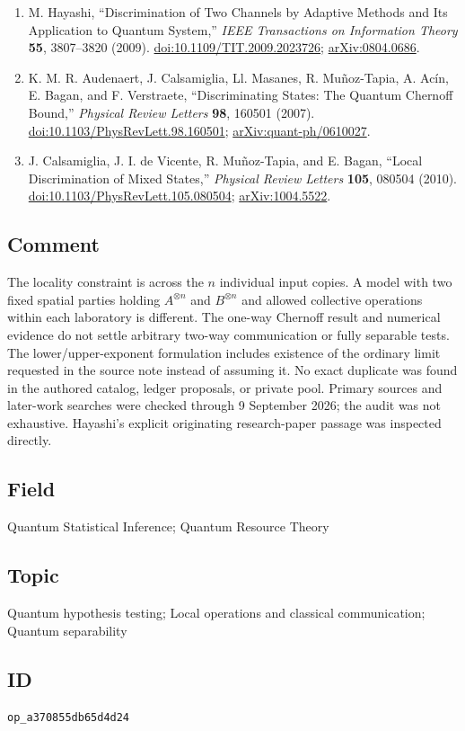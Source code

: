 \begin{enumerate}[label={},leftmargin=4.8em,labelsep=0.5em]
  \footnotesize
  \item[\textup{[Hay09]}]\label{ref:copych-hayashi}
  M. Hayashi, ``Discrimination of Two Channels by Adaptive Methods and Its Application to Quantum System,'' \emph{IEEE Transactions on Information Theory} \textbf{55}, 3807–3820 (2009). \href{https://doi.org/10.1109/TIT.2009.2023726}{doi:10.1109/TIT.2009.2023726}; \href{https://arxiv.org/abs/0804.0686}{arXiv:0804.0686}.

  \item[\textup{[ACM+07]}]\label{ref:copych-quantum}
  K. M. R. Audenaert, J. Calsamiglia, Ll. Masanes, R. Muñoz-Tapia, A. Acín, E. Bagan, and F. Verstraete, ``Discriminating States: The Quantum Chernoff Bound,'' \emph{Physical Review Letters} \textbf{98}, 160501 (2007). \href{https://doi.org/10.1103/PhysRevLett.98.160501}{doi:10.1103/PhysRevLett.98.160501}; \href{https://arxiv.org/abs/quant-ph/0610027}{arXiv:quant-ph/0610027}.

  \item[\textup{[CdVMB10]}]\label{ref:copych-numerics}
  J. Calsamiglia, J. I. de Vicente, R. Muñoz-Tapia, and E. Bagan, ``Local Discrimination of Mixed States,'' \emph{Physical Review Letters} \textbf{105}, 080504 (2010). \href{https://doi.org/10.1103/PhysRevLett.105.080504}{doi:10.1103/PhysRevLett.105.080504}; \href{https://arxiv.org/abs/1004.5522}{arXiv:1004.5522}.
\end{enumerate}

\subsection*{Comment}

The locality constraint is across the $n$ individual input copies. A model with two fixed spatial parties holding $A^{\otimes n}$ and $B^{\otimes n}$ and allowed collective operations within each laboratory is different. The one-way Chernoff result and numerical evidence do not settle arbitrary two-way communication or fully separable tests. The lower/upper-exponent formulation includes existence of the ordinary limit requested in the source note instead of assuming it. No exact duplicate was found in the authored catalog, ledger proposals, or private pool. Primary sources and later-work searches were checked through 9 September 2026; the audit was not exhaustive. Hayashi's explicit originating research-paper passage was inspected directly.

\subsection*{Field}

Quantum Statistical Inference; Quantum Resource Theory

\subsection*{Topic}

Quantum hypothesis testing; Local operations and classical communication; Quantum separability

\subsection*{ID}

\texttt{op\_a370855db65d4d24}
